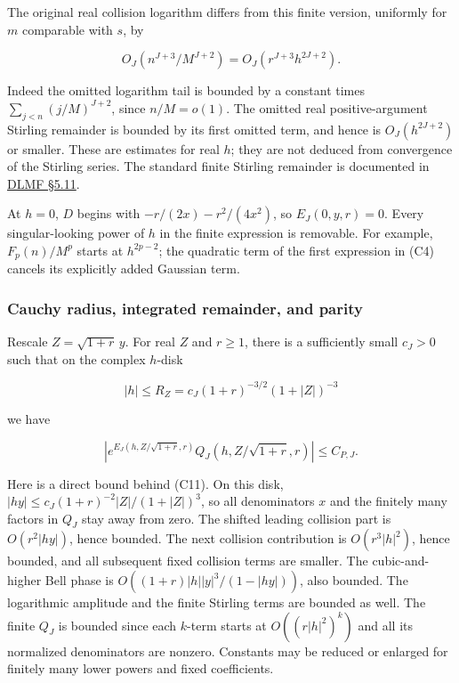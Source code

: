 The original real collision logarithm differs from this finite version,
uniformly for \(m\) comparable with \(s\), by

\[
 O_J(n^{J+3}/M^{J+2})
 =O_J(r^{J+3}h^{2J+2}).
 \tag{C9}\label{tcl:eq:C9}
\]

Indeed the omitted logarithm tail is bounded by a constant times
\(\sum_{j<n}(j/M)^{J+2}\), since \(n/M=o(1)\). The omitted real
positive-argument Stirling remainder is bounded by its first omitted
term, and hence is \(O_J(h^{2J+2})\) or smaller. These are estimates for
real \(h\); they are not deduced from convergence of the Stirling
series. The standard finite Stirling remainder is documented in
\href{https://dlmf.nist.gov/5.11}{DLMF §5.11}.

At \(h=0\), \(D\) begins with \(-r/(2x)-r^2/(4x^2)\), so
\(E_J(0,y,r)=0\). Every singular-looking power of \(h\) in the finite
expression is removable. For example, \(F_p(n)/M^p\) starts at
\(h^{2p-2}\); the quadratic term of the first expression in (C4) cancels
its explicitly added Gaussian term.

\subsubsection{Cauchy radius, integrated remainder, and
parity}\label{tcl:cauchy-radius-integrated-remainder-and-parity}

Rescale \(Z=\sqrt{1+r}\,y\). For real \(Z\) and \(r\ge1\), there is a
sufficiently small \(c_J>0\) such that on the complex \(h\)-disk

\[
 |h|\le R_Z=c_J(1+r)^{-3/2}(1+|Z|)^{-3}
 \tag{C10}\label{tcl:eq:C10}
\]

we have

\[
 |e^{E_J(h,Z/\sqrt{1+r},r)}Q_J(h,Z/\sqrt{1+r},r)|\le C_{P,J}.
 \tag{C11}\label{tcl:eq:C11}
\]

Here is a direct bound behind (C11). On this disk,
\(|hy|\le c_J(1+r)^{-2}|Z|/(1+|Z|)^3\), so all denominators \(x\) and
the finitely many factors in \(Q_J\) stay away from zero. The shifted
leading collision part is \(O(r^2|hy|)\), hence bounded. The next
collision contribution is \(O(r^3|h|^2)\), hence bounded, and all
subsequent fixed collision terms are smaller. The cubic-and-higher Bell
phase is \(O((1+r)|h||y|^3/(1-|hy|))\), also bounded. The logarithmic
amplitude and the finite Stirling terms are bounded as well. The finite
\(Q_J\) is bounded since each \(k\)-term starts at \(O((r|h|^2)^k)\) and
all its normalized denominators are nonzero. Constants may be reduced or
enlarged for finitely many lower powers and fixed coefficients.

